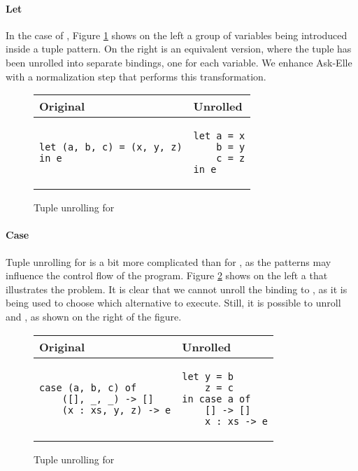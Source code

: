 \paragraph{Let}

In the case of , Figure \ref{fig:patterns-tuple-unrolling-let} shows on the left a group of variables being introduced inside a tuple pattern. On the right is an equivalent version, where the tuple has been unrolled into separate bindings, one for each variable. We enhance Ask-Elle with a normalization step that performs this transformation.



\begin{figure}
\centering
\begin{tabular}{ >{\centering\arraybackslash}m{14em} | >{\centering\arraybackslash}m{8em}}
Original & Unrolled \\
\hline
\begin{verbatim}
let (a, b, c) = (x, y, z)
in e
\end{verbatim}
& \begin{verbatim}
let a = x
    b = y
    c = z
in e
\end{verbatim}
\end{tabular}
\caption{Tuple unrolling for }
\label{fig:patterns-tuple-unrolling-let}
\end{figure}

\paragraph{Case}

Tuple unrolling for  is a bit more complicated than for , as the patterns may influence the control flow of the program. Figure \ref{fig:patterns-tuple-unrolling-case} shows on the left a  that illustrates the problem. It is clear that we cannot unroll the binding to , as it is being used to choose which alternative to execute. Still, it is possible to unroll  and , as shown on the right of the figure.

\begin{figure}
\centering
\begin{tabular}{ >{\centering\arraybackslash}m{14em} | >{\centering\arraybackslash}m{8em} }
Original & Unrolled \\
\hline
\begin{verbatim}
case (a, b, c) of
    ([], _, _) -> []
    (x : xs, y, z) -> e
\end{verbatim}
& \begin{verbatim}
let y = b
    z = c
in case a of
    [] -> []
    x : xs -> e
\end{verbatim}
\end{tabular}
\caption{Tuple unrolling for }
\label{fig:patterns-tuple-unrolling-case}
\end{figure}

